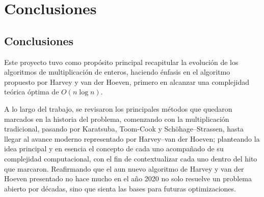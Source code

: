 \chapter{Conclusiones}
\label{ch:con}
\section{Conclusiones}

Este proyecto tuvo como propósito principal recapitular la evolución de los algoritmos de multiplicación de enteros, haciendo énfasis en el algoritmo propuesto por Harvey y van der Hoeven, primero en alcanzar una complejidad teórica óptima de \( O(n \log n) \).

A lo largo del trabajo, se revisaron los principales métodos que quedaron marcados en la historia del problema, comenzando con la multiplicación tradicional, pasando por Karatsuba, Toom-Cook y Schöhage–Strassen, hasta llegar al avance moderno representado por Harvey–van der Hoeven; planteando la idea principal y en esencia el concepto de cada uno acompañado de su complejidad computacional, con el fin de contextualizar cada uno dentro del hito que marcaron. Reafirmando que el aun nuevo algoritmo de Harvey y van der Hoeven presentado no hace mucho en el año 2020 no solo resuelve un problema abierto por décadas, sino que sienta las bases para futuras optimizaciones.
